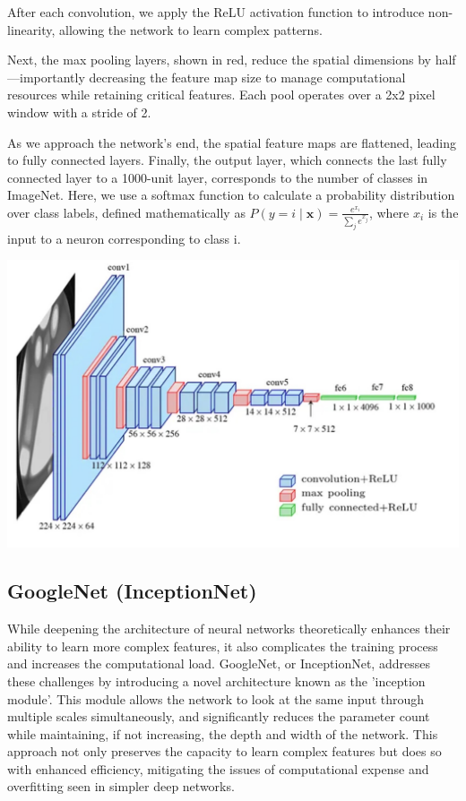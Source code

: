 \documentclass{article}
\begin{document}
        After each convolution, we apply the ReLU activation function to introduce non-linearity, allowing the network to learn complex patterns.

        Next, the max pooling layers, shown in red, reduce the spatial dimensions by half—importantly decreasing the feature map size to manage computational resources while retaining critical features. Each pool operates over a 2x2 pixel window with a stride of 2.

        As we approach the network's end, the spatial feature maps are flattened, leading to fully connected layers. Finally, the output layer, which connects the last fully connected layer to a 1000-unit layer, corresponds to the number of classes in ImageNet. Here, we use a softmax function to calculate a probability distribution over class labels, defined mathematically as \( P(y = i \mid \mathbf{x}) = \frac{e^{x_i}}{\sum_{j} e^{x_j}} \), where \( x_i \) is the input to a neuron corresponding to class i.
        
        \begin{center}
            \includegraphics[scale=0.4]{images/VGG.jpg}
        \end{center}
        
    \subsection{GoogleNet (InceptionNet)}
        
        While deepening the architecture of neural networks theoretically enhances their ability to learn more complex features, it also complicates the training process and increases the computational load. GoogleNet, or InceptionNet, addresses these challenges by introducing a novel architecture known as the 'inception module'. This module allows the network to look at the same input through multiple scales simultaneously, and significantly reduces the parameter count while maintaining, if not increasing, the depth and width of the network. This approach not only preserves the capacity to learn complex features but does so with enhanced efficiency, mitigating the issues of computational expense and overfitting seen in simpler deep networks.
        
\end{document}
